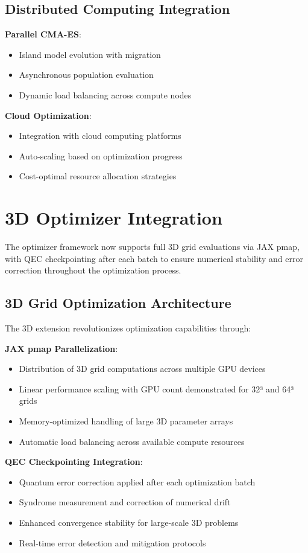 \documentclass[11pt,a4paper]{article}
\begin{document}
\subsection{Distributed Computing Integration}

\textbf{Parallel CMA-ES}:
\begin{itemize}
\item Island model evolution with migration
\item Asynchronous population evaluation
\item Dynamic load balancing across compute nodes
\end{itemize}

\textbf{Cloud Optimization}:
\begin{itemize}
\item Integration with cloud computing platforms
\item Auto-scaling based on optimization progress
\item Cost-optimal resource allocation strategies
\end{itemize}

\section{3D Optimizer Integration}

The optimizer framework now supports full 3D grid evaluations via JAX pmap, with QEC checkpointing after each batch to ensure numerical stability and error correction throughout the optimization process.

\subsection{3D Grid Optimization Architecture}

The 3D extension revolutionizes optimization capabilities through:

\textbf{JAX pmap Parallelization}:
\begin{itemize}
\item Distribution of 3D grid computations across multiple GPU devices
\item Linear performance scaling with GPU count demonstrated for 32³ and 64³ grids
\item Memory-optimized handling of large 3D parameter arrays
\item Automatic load balancing across available compute resources
\end{itemize}

\textbf{QEC Checkpointing Integration}:
\begin{itemize}
\item Quantum error correction applied after each optimization batch
\item Syndrome measurement and correction of numerical drift
\item Enhanced convergence stability for large-scale 3D problems
\item Real-time error detection and mitigation protocols
\end{itemize}
\end{document}
